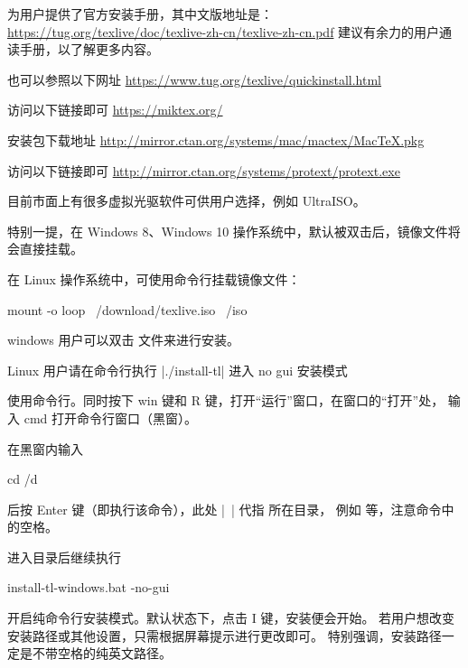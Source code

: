 
\TeXLive{} 为用户提供了官方安装手册，其中文版地址是：
\url{https://tug.org/texlive/doc/texlive-zh-cn/texlive-zh-cn.pdf}
建议有余力的用户通读手册，以了解更多内容。

也可以参照以下网址 \url{https://www.tug.org/texlive/quickinstall.html}


访问以下链接即可 \url{https://miktex.org/}


\MacTeX{} 安装包下载地址 \url{http://mirror.ctan.org/systems/mac/mactex/MacTeX.pkg}



访问以下链接即可 \url{http://mirror.ctan.org/systems/protext/protext.exe}



目前市面上有很多虚拟光驱软件可供用户选择，例如 UltraISO。

特别一提，在 Windows 8、Windows 10
操作系统中，默认被双击后，镜像文件将会直接挂载。

在 Linux 操作系统中，可使用命令行挂载镜像文件：
\begin{shcode}
mount -o loop ~/download/texlive.iso ~/iso
\end{shcode}



windows 用户可以双击  文件来进行安装。

Linux 用户请在命令行执行 |./install-tl| 进入 no gui 安装模式



使用命令行。同时按下 win 键和 R 键，打开“运行”窗口，在窗口的“打开”处，
输入 cmd 打开命令行窗口（黑窗）。

在黑窗内输入
\begin{shcode}
cd /d ~
\end{shcode}
后按 Enter 键（即执行该命令），此处 |~| 代指  
所在目录，
例如  等，注意命令中的空格。

进入目录后继续执行
\begin{shcode}
install-tl-windows.bat -no-gui
\end{shcode}
开启纯命令行安装模式。默认状态下，点击 I 键，安装便会开始。
若用户想改变安装路径或其他设置，只需根据屏幕提示进行更改即可。
特别强调，安装路径一定是不带空格的纯英文路径。


